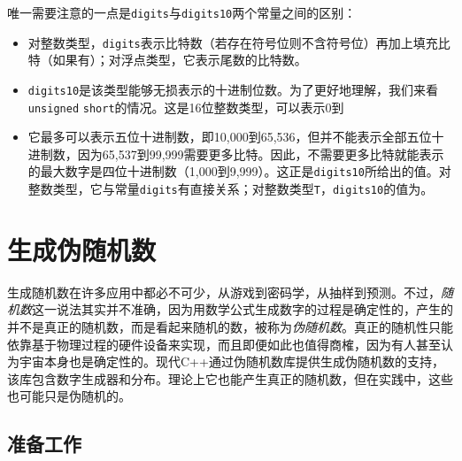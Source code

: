 
唯一需要注意的一点是\texttt{digits}与\texttt{digits10}两个常量之间的区别：



\begin{itemize}
\item 对整数类型，\texttt{digits}表示比特数（若存在符号位则不含符号位）再加上填充比特（如果有）；对浮点类型，它表示尾数的比特数。



\item \texttt{digits10}是该类型能够无损表示的十进制位数。为了更好地理解，我们来看\texttt{unsigned} \texttt{short}的情况。这是16位整数类型，可以表示0到



\item 它最多可以表示五位十进制数，即10,000到65,536，但并不能表示全部五位十进制数，因为65,537到99,999需要更多比特。因此，不需要更多比特就能表示的最大数字是四位十进制数（1,000到9,999）。这正是\texttt{digits10}所给出的值。对整数类型，它与常量\texttt{digits}有直接关系；对整数类型\texttt{T}，\texttt{digits10}的值为。

\end{itemize}



\section{生成伪随机数}



生成随机数在许多应用中都必不可少，从游戏到密码学，从抽样到预测。不过，\textit{随机数}这一说法其实并不准确，因为用数学公式生成数字的过程是确定性的，产生的并不是真正的随机数，而是看起来随机的数，被称为\textit{伪随机数}。真正的随机性只能依靠基于物理过程的硬件设备来实现，而且即便如此也值得商榷，因为有人甚至认为宇宙本身也是确定性的。现代C++通过伪随机数库提供生成伪随机数的支持，该库包含数字生成器和分布。理论上它也能产生真正的随机数，但在实践中，这些也可能只是伪随机的。



\subsection{准备工作}



